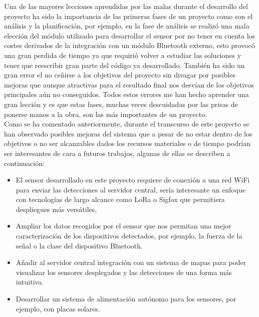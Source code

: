 \documentclass[../proyecto.tex]{subfiles}
\begin{document}
Una de las mayores lecciones aprendidas por las malas durante el desarrollo del proyecto ha sido la importancia de las primeras fases de un proyecto como son el análisis y la planificación, por ejemplo, en la fase de análisis se realizó una mala elección del módulo utilizado para desarrollar el sensor por no tener en cuenta los costes derivados de la integración con un módulo Bluetooth externo, esto provocó una gran perdida de tiempo ya que requirió volver a estudiar las soluciones y tener que reescribir gran parte del código ya desarrollado. También ha sido un gran error el no ceñirse a los objetivos del proyecto sin divagar por posibles mejoras que aunque atractivas para el resultado final nos desvían de los objetivos principales aún no conseguidos. Todos estos errores me han hecho aprender una gran lección y es que estas fases, muchas veces descuidadas por las prisas de ponerse manos a la obra, son las más importantes de un proyecto.\\

Como se ha comentado anteriormente, durante el transcurso de este proyecto se han observado posibles mejoras del sistema que a pesar de no estar dentro de los objetivos o no ser alcanzables dados los recursos materiales o de tiempo podrían ser interesantes de cara a futuros trabajos, algunas de ellas se describen a continuación:\\

\begin{itemize}
  \item El sensor desarrollado en este proyecto requiere de conexión a una red WiFi para enviar las detecciones al servidor central, sería interesante un enfoque con tecnologías de largo alcance como LoRa o Sigfox que permitiera despliegues más versátiles.
  \item Ampliar los datos recogidos por el sensor que nos permitan una mejor caracterización de los dispositivos detectados, por ejemplo, la fuerza de la señal o la clase del dispositivo Bluetooth.
  \item Añadir al servidor central integración con un sistema de mapas para poder visualizar los sensores desplegados y las detecciones de una forma más intuitiva.
  \item Desarrollar un sistema de alimentación autónomo para los sensores, por ejemplo, con placas solares.

\end{itemize}
\end{document}
